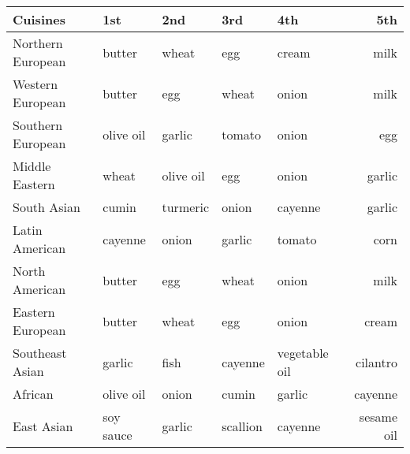 \documentclass[12pt]{article}
\begin{document}
	\begin{tabular}{|l|l|l|l|l|r|}
	\hline
	Cuisines			&	1st			&	2nd		&	3rd		&	4th		&	5th\\
	\hline
	Northern European & butter&wheat&egg&cream&milk\\
	\hline
	Western European & butter&egg&wheat&onion&milk\\
	\hline
	Southern European & olive oil&garlic&tomato&onion&egg\\
	\hline
	Middle Eastern & wheat&olive oil&egg&onion&garlic\\
	\hline
	South Asian & cumin&turmeric&onion&cayenne&garlic\\
	\hline
	Latin American & cayenne&onion&garlic&tomato&corn\\
	\hline
	North American & butter&egg&wheat&onion&milk\\
	\hline
	Eastern European & butter&wheat&egg&onion&cream\\
	\hline
	Southeast Asian & garlic&fish&cayenne&vegetable oil&cilantro\\
	\hline
	African & olive oil&onion&cumin&garlic&cayenne\\
	\hline
	East Asian & soy sauce&garlic&scallion&cayenne&sesame oil\\
	\hline
	\end{tabular}\\
\end{document}
